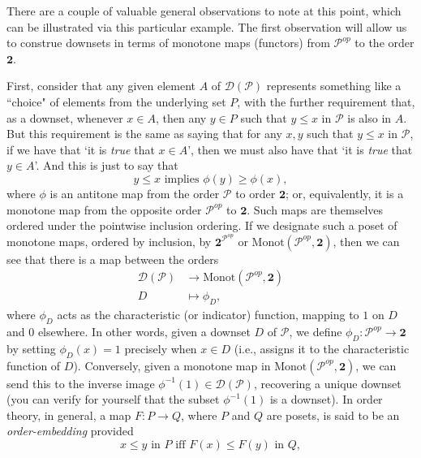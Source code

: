 \documentclass[a4paper]{book}
\theoremstyle{definition}
\theoremstyle{definition}
\theoremstyle{definition}
\theoremstyle{theorem}
\theoremstyle{definition}
\begin{document}
There are a couple of valuable general observations to note at this point, which can be illustrated via this particular example. The first observation will allow us to construe downsets in terms of monotone maps (functors) from $\mathcal{P}^{op}$ to the order $\textbf{2}$.\par 
First, consider that any given element $A$ of $\mathcal{D}(\mathcal{P})$ represents something like a ``choice" of elements from the underlying set $P$, with the further requirement that, as a downset, whenever $x \in A$, then any $y \in P$ such that $y \leq x$ in $\mathcal{P}$ is also in $A$. But this requirement is the same as saying that for any $x, y$ such that $y \leq x$ in $\mathcal{P}$, if we have that `it is \textit{true} that $x \in A$', then we must also have that `it is \textit{true} that $y \in A$'. And this is just to say that 
\begin{equation*}
y \leq x \text{ implies } \phi(y) \geq \phi(x),
\end{equation*}  
where $\phi$ is an antitone map from the order $\mathcal{P}$ to order $\textbf{2}$; or, equivalently, it is a monotone map from the opposite order $\mathcal{P}^{op}$ to $\textbf{2}$. Such maps are themselves ordered under the pointwise inclusion ordering. If we designate such a poset of monotone maps, ordered by inclusion, by $\textbf{2}^{\mathcal{P}^{op}}$ or $\text{Monot}(\mathcal{P}^{op}, \textbf{2})$, then we can see that there is a map between the orders 
\begin{align*}
\mathcal{D}(\mathcal{P}) & \rightarrow \text{Monot}(\mathcal{P}^{op}, \textbf{2}) \\ 
D & \mapsto \phi_D,
\end{align*} 
where $\phi_D$ acts as the characteristic (or indicator) function, mapping to $1$ on $D$ and $0$ elsewhere. In other words, given a downset $D$ of $\mathcal{P}$, we define $\phi_D: \mathcal{P}^{op} \rightarrow \textbf{2}$ by setting $\phi_D(x) = 1$ precisely when $x \in D$ (i.e., assigns it to the characteristic function of $D$). Conversely, given a monotone map in $\text{Monot}(\mathcal{P}^{op}, \textbf{2})$, we can send this to the inverse image $\phi^{-1}(1) \in \mathcal{D}(\mathcal{P})$, recovering a unique downset (you can verify for yourself that the subset $\phi^{-1}(1)$ is a downset). In order theory, in general, a map $F: P \rightarrow Q$, where $P$ and $Q$ are posets, is said to be an \textit{order-embedding}  provided 
\begin{equation*}
x \leq y \text{ in } P \text{ iff } F(x) \leq F(y) \text{ in } Q,
\end{equation*}
\end{document}

